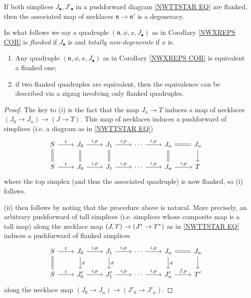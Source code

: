 \documentclass{hha}
\theoremstyle{definition} %
\begin{document}
\begin{remark}\label{FLNKNECDEG REM}
	If both simplices 
	$J_{\bullet},J'_{\bullet}$ in a pushforward diagram
	\eqref{NWTTSTAR EQ}
	are flanked,
	then the associated map of necklaces
	$\mathfrak{n} \to \mathfrak{n}'$
	is a degeneracy.
\end{remark}


In what follows we say a quadruple
$(\mathfrak{n},\phi,x,J_{\bullet})$
as in Corollary \ref{NWXREPS COR}
is \emph{flanked} if $J_{\bullet}$ is and
\emph{totally non-degenerate} if $x$ is.


\begin{lemma}[{cf. \cite[Lemma 4.5]{DS11}}]
	\label{FLANKING LEM}
	\begin{enumerate}[label=(\roman*)]
		\item Any quadruple $(\mathfrak{n},\phi,x,J_{\bullet})$
		as in Corollary \ref{NWXREPS COR} is equivalent a flanked one;
		\item if two flanked quadruples are equivalent, then the equivalence can be described via a zigzag involving only flanked quadruples.
	\end{enumerate}
\end{lemma}


\begin{proof}
	The key to (i) is the fact that 
	the map $J_n \to T$
	induces a map of necklaces
	$(J_0 \to J_n) \to (J \to T)$.
	This map of necklaces induces a pushforward of simplices
	(i.e. a diagram as in \eqref{NWTTSTAR EQ})
\begin{equation}\label{FLANKING EQ}
\begin{tikzcd}
	S \ar{r}{t} \ar[equal]{d}
&
	J_0 \ar{r}{i,p} \ar[equal]{d}
&
	J_1 \ar{r}{i,p} \ar[equal]{d}
&
	\cdots
	\ar{r}{i,p}
&
	J_n \ar[equal]{r} \ar[equal]{d}
&
	J_n \ar{d}
\\
	S \ar{r}{t}
&
	J_0 \ar{r}{i,p}
&
	J_1 \ar{r}{i,p}
&
	\cdots
	\ar{r}{i,p}
&
	J_n \ar{r}{i,p}
&
	T
\end{tikzcd}
\end{equation}	
	where the top simplex (and thus the associated quadruple) is now flanked, so (i) follows.

	(ii) then follows by noting that the procedure above is natural.
	More precisely, 
	an arbitrary pushforward of tall simplices
	(i.e. simplices whose composite map is a tall map)
	along the necklace map $(J,T) \to (J^{\**} \to T^{\**})$
	as in \eqref{NWTTSTAR EQ}
	induces a pushforward of flanked simplices
\begin{equation}
\begin{tikzcd}
	S \ar{r}{t} \ar[equal]{d}
&
	J_0 \ar{r}{i,p} \ar{d}{d}
&
	J_1 \ar{r}{i,p} \ar{d}{d}
&
	\cdots \ar{r}{i,p}
&
	J_n \ar[equal]{r} \ar{d}{d}
&
	J_n \ar{d}
\\
	S \ar{r}{t} 
&
	J'_0 \ar{r}{i,p}
&
	J'_1 \ar{r}{i,p}
&
	\cdots \ar{r}{i,p}
&
	J'_n \ar{r}{f,p}
&
	T'
\end{tikzcd}
\end{equation}
along the necklace map
$(J_0 \to J_n) \to (J'_0 \to J'_n)$.
\end{proof}
\end{document}
